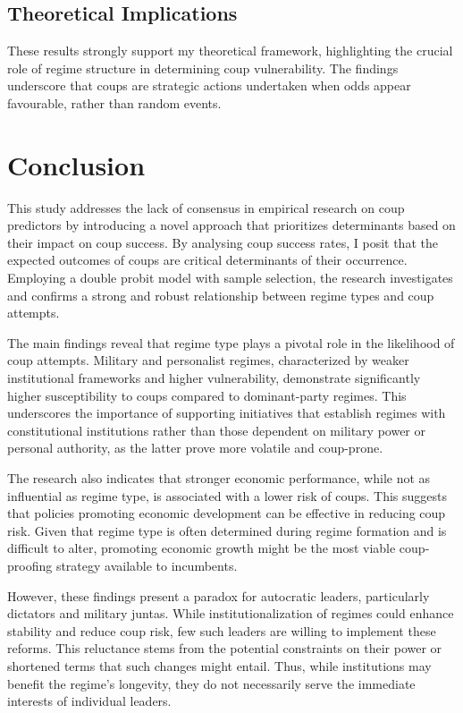\documentclass[
  12pt,
]{report}
\begin{document}
\subsection{Theoretical Implications}\label{theoretical-implications}

These results strongly support my theoretical framework, highlighting
the crucial role of regime structure in determining coup vulnerability.
The findings underscore that coups are strategic actions undertaken when
odds appear favourable, rather than random events.

\section{Conclusion}\label{conclusion}

This study addresses the lack of consensus in empirical research on coup
predictors by introducing a novel approach that prioritizes determinants
based on their impact on coup success. By analysing coup success rates,
I posit that the expected outcomes of coups are critical determinants of
their occurrence. Employing a double probit model with sample selection,
the research investigates and confirms a strong and robust relationship
between regime types and coup attempts.

The main findings reveal that regime type plays a pivotal role in the
likelihood of coup attempts. Military and personalist regimes,
characterized by weaker institutional frameworks and higher
vulnerability, demonstrate significantly higher susceptibility to coups
compared to dominant-party regimes. This underscores the importance of
supporting initiatives that establish regimes with constitutional
institutions rather than those dependent on military power or personal
authority, as the latter prove more volatile and coup-prone.

The research also indicates that stronger economic performance, while
not as influential as regime type, is associated with a lower risk of
coups. This suggests that policies promoting economic development can be
effective in reducing coup risk. Given that regime type is often
determined during regime formation and is difficult to alter, promoting
economic growth might be the most viable coup-proofing strategy
available to incumbents.

However, these findings present a paradox for autocratic leaders,
particularly dictators and military juntas. While institutionalization
of regimes could enhance stability and reduce coup risk, few such
leaders are willing to implement these reforms. This reluctance stems
from the potential constraints on their power or shortened terms that
such changes might entail. Thus, while institutions may benefit the
regime's longevity, they do not necessarily serve the immediate
interests of individual leaders.
\end{document}
